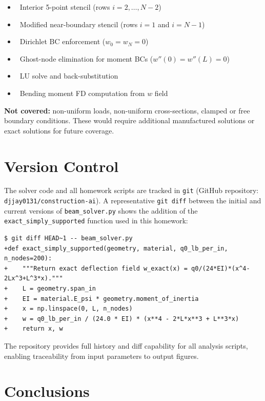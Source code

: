 \documentclass[11pt,letterpaper]{article}
\begin{document}
\begin{itemize}[nosep]
  \item \checkmark\ Interior 5-point stencil (rows $i = 2, \ldots, N-2$)
  \item \checkmark\ Modified near-boundary stencil (rows $i = 1$ and $i = N-1$)
  \item \checkmark\ Dirichlet BC enforcement ($w_0 = w_N = 0$)
  \item \checkmark\ Ghost-node elimination for moment BCs ($w''(0)=w''(L)=0$)
  \item \checkmark\ LU solve and back-substitution
  \item \checkmark\ Bending moment FD computation from $w$ field
\end{itemize}

\noindent\textbf{Not covered:} non-uniform loads, non-uniform cross-sections, clamped
or free boundary conditions.  These would require additional manufactured solutions
or exact solutions for future coverage.

\section{Version Control}
\label{sec:git}

The solver code and all homework scripts are tracked in \texttt{git}
(GitHub repository: \texttt{djjay0131/construction-ai}).
A representative \texttt{git diff} between the initial and current versions of
\texttt{beam\_solver.py} shows the addition of the \texttt{exact\_simply\_supported}
function used in this homework:

\begin{verbatim}
$ git diff HEAD~1 -- beam_solver.py
+def exact_simply_supported(geometry, material, q0_lb_per_in, n_nodes=200):
+    """Return exact deflection field w_exact(x) = q0/(24*EI)*(x^4-2Lx^3+L^3*x)."""
+    L = geometry.span_in
+    EI = material.E_psi * geometry.moment_of_inertia
+    x = np.linspace(0, L, n_nodes)
+    w = q0_lb_per_in / (24.0 * EI) * (x**4 - 2*L*x**3 + L**3*x)
+    return x, w
\end{verbatim}

The repository provides full history and diff capability for all analysis scripts,
enabling traceability from input parameters to output figures.

\section{Conclusions}
\label{sec:conclusions}
\end{document}

